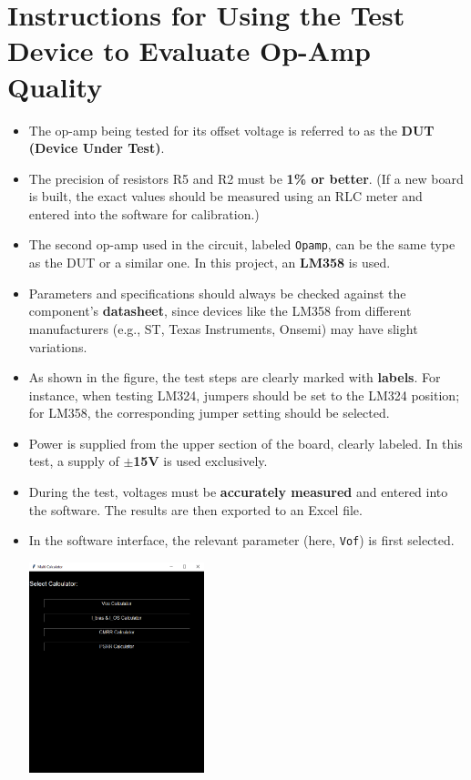 \documentclass[a4paper,12pt]{article}
\begin{document}
\section*{Instructions for Using the Test Device to Evaluate Op-Amp Quality}

\begin{itemize}
  \item The op-amp being tested for its offset voltage is referred to as the \textbf{DUT (Device Under Test)}.
  
  \item The precision of resistors R5 and R2 must be \textbf{1\% or better}. (If a new board is built, the exact values should be measured using an RLC meter and entered into the software for calibration.)

  \item The second op-amp used in the circuit, labeled \texttt{Opamp}, can be the same type as the DUT or a similar one. In this project, an \textbf{LM358} is used.

  \item Parameters and specifications should always be checked against the component's \textbf{datasheet}, since devices like the LM358 from different manufacturers (e.g., ST, Texas Instruments, Onsemi) may have slight variations.

  \item As shown in the figure, the test steps are clearly marked with \textbf{labels}. For instance, when testing LM324, jumpers should be set to the LM324 position; for LM358, the corresponding jumper setting should be selected.

  \item Power is supplied from the upper section of the board, clearly labeled. In this test, a supply of \textbf{$\pm$15V} is used exclusively.

  \item During the test, voltages must be \textbf{accurately measured} and entered into the software. The results are then exported to an Excel file.

  \item In the software interface, the relevant parameter (here, \texttt{Vof}) is first selected.

\begin{center}
  \includegraphics[width=0.4\textwidth]{IMAGEs/vos_software.png}
\end{center}


\end{itemize}
\end{document}
